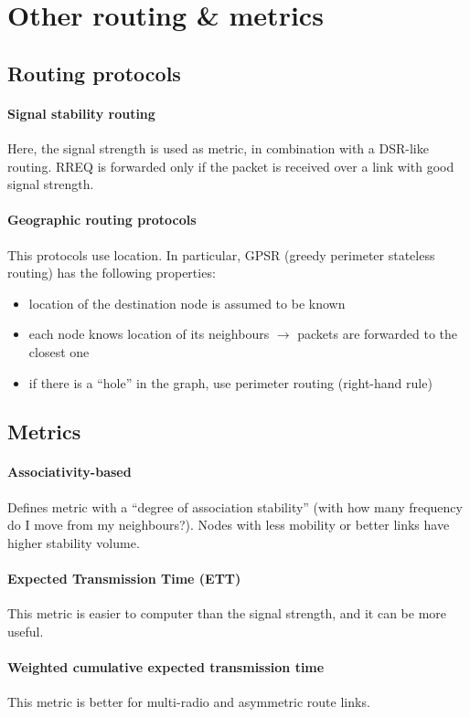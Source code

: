 \section{Other routing \& metrics}

\subsection{Routing protocols}

\paragraph*{Signal stability routing} Here, the signal strength is used as
metric, in combination with a DSR-like routing. RREQ is forwarded only if the
packet is received over a link with good signal strength.

\paragraph*{Geographic routing protocols} This protocols use location. In
particular, GPSR (greedy perimeter stateless routing) has the following
properties:
\begin{itemize}
\item location of the destination node is assumed to be known
\item each node knows location of its neighbours $\to$ packets are forwarded to
  the closest one
\item if there is a ``hole'' in the graph, use perimeter routing (right-hand
rule) 
\end{itemize}

\subsection{Metrics}

\paragraph*{Associativity-based} 
Defines metric with a ``degree of association stability'' (with how many
frequency do I move from my neighbours?). Nodes with less mobility or better
links have higher stability volume.

\paragraph*{Expected Transmission Time (ETT)} This metric is easier to computer
than the signal strength, and it can be more useful.

\paragraph*{Weighted cumulative expected transmission time} This metric is
better for multi-radio and asymmetric route links.
